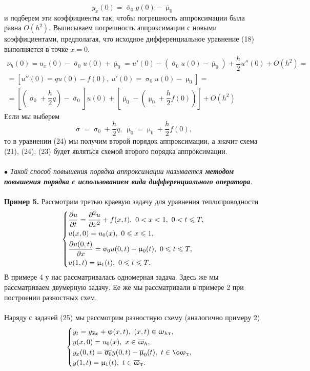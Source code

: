 \documentclass[a4paper, 12pt]{report}
\numberwithin{equation}{section}
\newcommand{\ol}{\overline}
\renewcommand{\leq}{\leqslant}
\renewcommand{\varphi}{\upvarphi}
\renewcommand{\tau}{\uptau}
\renewcommand{\sigma}{\upsigma}
\renewcommand{\mu}{\upmu}
\renewcommand{\omega}{\upomega}
\renewcommand{\d}{\partial}
\begin{document}
\begin{equation}
	y_x(0) = \ol \sigma_0 y(0) - \ol \mu _0
\end{equation}
и подберем эти коэффициенты так, чтобы погрешность аппроксимации была равна $O(h^2)$. Выписываем погрешность аппроксимации с новыми коэффициентами, предполагая, что исходное дифференциальное уравнение (18) выполняется в точке $x =0$.
\begin{multline*}
 	\nu_h(0) = u_x(0) - \ol\sigma_0 u(0) + \ol\mu_0 = u'(0) - (\ol\sigma_0 u(0) - \ol \mu_0)+ \dfrac h2 u''(0) + O(h^2) =\\= [u''(0) =qu(0) - f(0),\ u'(0)=\sigma_0 u(0) - \mu_0] =\\= \left[\left(\sigma_0 + \dfrac h2 q\right) - \ol\sigma_0\right]u(0) + \left[\ol \mu_0 - \left(\mu_0 + \dfrac h2 f(0)\right)\right] + O(h^2)
\end{multline*}
Если мы выберем
$$\ol \sigma = \sigma_0 + \dfrac h2 q,\ \ol\mu_0 = \mu_0 + \dfrac h2 f(0),$$ то в уравнении (24) мы получим второй порядок аппроксимации, а значит схема (21), (24), (23) будет являться схемой второго порядка аппроксимации.\\\\
$\bullet$ \textit{Такой способ повышения порядка аппроксимации называется \textbf{методом повышения порядка с использованием вида дифференциального оператора}.}\\\\
\textbf{Пример 5.} Рассмотрим третью краевую задачу для уравнения теплопроводности
\begin{equation}
	\begin{dcases}
	\dfrac{\d u}{\d t} = \dfrac{\d ^2 u}{\d x^2} + f(x,t),\ 0 < x < 1,\ 0 < t \leq T,\\
	u(x,0) = u_0(x),\ 0 \leq x \leq 1,\\
	\dfrac{\d u(0,t)}{\d x} = \sigma_0 u(0,t) - \mu_0(t),\ 0 \leq t \leq T,\\
	u(1,t) = \mu_1(t),\ 0 \leq t \leq T.
\end{dcases}
\end{equation}
В примере 4 у нас рассматривалась одномерная задача. Здесь же мы рассматриваем двумерную задачу. Ее же мы рассматривали в примере 2 при построении разностных схем.
\\\\
Наряду с задачей (25) мы рассмотрим разностную схему (аналогично примеру 2)
\begin{equation}
	\begin{cases}
		y_t = y_{\ol x x} + \varphi(x,t),\ (x,t) \in \omega_{h\tau},\\
	y(x,0) = u_0(x),\ x \in \ol\omega_h,\\
	y_x(0, t) = \overline{\sigma_0} y(0,t) - \ol \mu_0 (t),\ t \in \o \omega_\tau,\\
	y(1,t) = \mu_1(t),\ t \in \ol \omega_\tau.
	\end{cases}
\end{equation}
\end{document}
